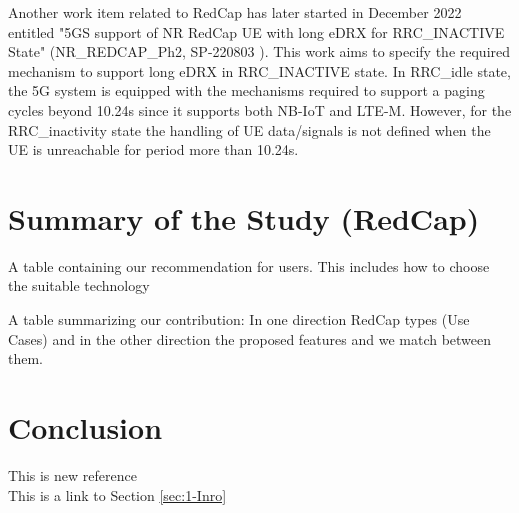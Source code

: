 \documentclass[conference]{IEEEtran}
\begin{document}
Another work item related to RedCap has later started in December 2022 entitled "5GS support of NR RedCap UE with long eDRX for RRC\_INACTIVE State" (NR\_REDCAP\_Ph2, SP-220803 \cite{3gpp_5gs_2022_SP-220803}). This work aims to specify the required mechanism to support long eDRX in RRC\_INACTIVE state. In RRC\_idle state, the 5G system is equipped with the mechanisms required to support a paging cycles beyond 10.24s since it supports both NB-IoT and LTE-M. However, for the RRC\_inactivity state the handling of UE  data/signals is not defined when the UE is unreachable for period more than 10.24s.


\section{Summary of the Study (RedCap)}
\label{sec:7}


A table containing our recommendation for users. This includes how to choose the suitable technology 

A table summarizing our contribution: In one direction RedCap types (Use Cases) and in the other direction the proposed features and we match between them.
\cite{noauthor_5g_2020}

\section{Conclusion}
\label{sec:7-3}

This is new reference \cite{3gpp_study_2021_38.875}\\
This is a link to Section \ref{sec:1-Inro}



\end{document}
